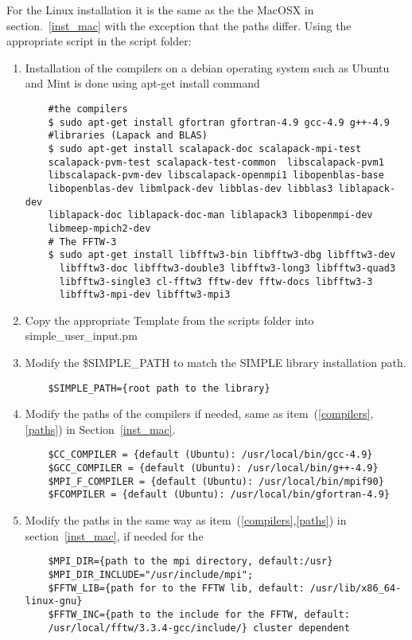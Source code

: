 \documentclass[review]{elsarticle}
\begin{document}
For the Linux installation it is the same as the the MacOSX in
section.~\ref{inst_mac} with the exception that the paths
differ. Using the appropriate script in the script folder:
\begin{enumerate}
\item Installation of the compilers on a debian operating system such
  as Ubuntu and Mint is done using apt-get install command
\begin{verbatim}
    #the compilers
    $ sudo apt-get install gfortran gfortran-4.9 gcc-4.9 g++-4.9
    #libraries (Lapack and BLAS)
    $ sudo apt-get install scalapack-doc scalapack-mpi-test
    scalapack-pvm-test scalapack-test-common  libscalapack-pvm1
    libscalapack-pvm-dev libscalapack-openmpi1 libopenblas-base
    libopenblas-dev libmlpack-dev libblas-dev libblas3 liblapack-dev
    liblapack-doc liblapack-doc-man liblapack3 libopenmpi-dev
    libmeep-mpich2-dev
    # The FFTW-3
    $ sudo apt-get install libfftw3-bin libfftw3-dbg libfftw3-dev
      libfftw3-doc libfftw3-double3 libfftw3-long3 libfftw3-quad3
      libfftw3-single3 cl-fftw3 fftw-dev fftw-docs libfftw3-3
      libfftw3-mpi-dev libfftw3-mpi3 
\end{verbatim}

\item Copy the appropriate Template from the scripts folder into simple\_user\_input.pm
\item Modify the \$SIMPLE\_PATH to match the SIMPLE library
  installation path.
\begin{verbatim}
    $SIMPLE_PATH={root path to the library}
\end{verbatim}
\item Modify the paths of the compilers if needed, same as
  item~(\ref{compilers},\ref{paths}) in Section~\ref{inst_mac}.

\begin{verbatim}
    $CC_COMPILER = {default (Ubuntu): /usr/local/bin/gcc-4.9}
    $GCC_COMPILER = {default (Ubuntu): /usr/local/bin/g++-4.9}
    $MPI_F_COMPILER = {default (Ubuntu): /usr/local/bin/mpif90}
    $FCOMPILER = {default (Ubuntu): /usr/local/bin/gfortran-4.9}
\end{verbatim}
\item Modify the paths in the same way as
  item~(\ref{compilers},\ref{paths}) in section~\ref{inst_mac}, if
  needed for the

\begin{verbatim}
    $MPI_DIR={path to the mpi directory, default:/usr}
    $MPI_DIR_INCLUDE="/usr/include/mpi";
    $FFTW_LIB={path for to the FFTW lib, default: /usr/lib/x86_64-linux-gnu}
    $FFTW_INC={path to the include for the FFTW, default:
    /usr/local/fftw/3.3.4-gcc/include/} cluster dependent


\end{verbatim}
\end{enumerate}
\end{document}

